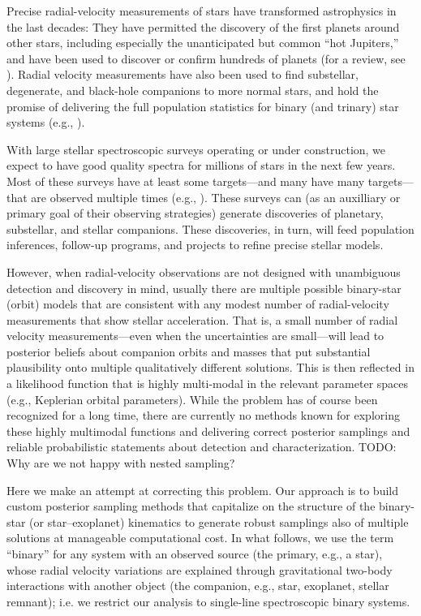 \documentclass[manuscript, letterpaper]{aastex6}
\newcommand{\todo}[1]{{\color{red}TODO: #1}}
\begin{document}
Precise radial-velocity measurements of stars have transformed
astrophysics in the last decades:
They have permitted the discovery of the first planets around other stars,
including especially the unanticipated but common ``hot Jupiters,''
and have been used to discover or confirm hundreds
of planets (for a review, see \citealt{Udry:2007}).
Radial velocity measurements have also been used to find substellar,
degenerate, and black-hole companions to more normal stars, and hold
the promise of delivering the full population statistics for binary
(and trinary) star systems (e.g., \citealt{Raghavan:2010,
Tokovinin:2014,Troup:2016}).

With large stellar spectroscopic surveys operating or under
construction, we expect to have good quality spectra for millions
of stars in the next few years.
Most of these surveys have at least some targets---and many have many
targets---that are observed multiple times (e.g., \citealt{Majewski:2015}).
These surveys can (as an auxilliary or primary goal of their observing
strategies) generate discoveries of planetary, substellar, and stellar
companions.
These discoveries, in turn, will feed population inferences, follow-up
programs, and projects to refine precise stellar models.

However, when radial-velocity observations are not designed with
unambiguous detection and discovery in mind, usually there are
multiple possible binary-star (orbit) models that are consistent with any
modest number of radial-velocity measurements that show stellar
acceleration.
That is, a small number of radial velocity measurements---even when the
uncertainties are small---will lead to posterior beliefs about companion
orbits and masses that put substantial plausibility onto multiple
qualitatively different solutions.
This is then reflected in a likelihood function that is highly multi-modal in
the relevant parameter spaces (e.g., Keplerian orbital parameters).
While the problem has of course been recognized for a long time, there are
currently no methods known for exploring these highly multimodal functions and
delivering correct posterior samplings and reliable probabilistic statements
about detection and characterization.
\todo{Why are we not happy with nested sampling?}

Here we make an attempt at correcting this problem.
Our approach is to build custom posterior sampling methods that capitalize on
the structure of the binary-star (or star--exoplanet) kinematics to generate
robust samplings also of multiple solutions at manageable computational cost.
In what follows, we use the term ``binary'' for any system with an observed
source (the primary, e.g., a star), whose radial velocity variations are
explained through gravitational two-body interactions with another object (the
companion, e.g., star, exoplanet, stellar remnant); i.e. we restrict our
analysis to single-line spectroscopic binary systems.
\end{document}
